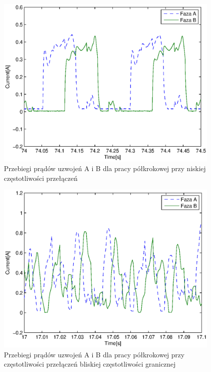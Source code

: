 \documentclass[12pt]{article}
\begin{document}
\begin{figure}[!htb]
	\begin{center}
		\includegraphics[width=11cm]{../res/img/pol_wol.eps}
	\end{center}
	\caption{Przebiegi prądów uzwojeń A i B dla pracy półkrokowej przy niskiej
	częstotliwości przełączeń}
\end{figure}
\begin{figure}[!htb]
	\begin{center}
		\includegraphics[width=11cm]{../res/img/pol_szyb.eps}
	\end{center}
	\caption{Przebiegi prądów uzwojeń A i B dla pracy półkrokowej przy
	częstotliwości przełączeń bliskiej częstotliwości granicznej}
\end{figure}
\end{document}
